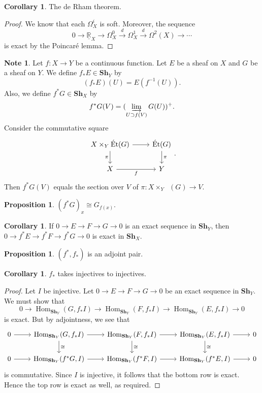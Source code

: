\documentclass[10pt,letterpaper,cm]{nupset}
\theoremstyle{definition}
\newtheorem{note}[definition]{Note}
\theoremstyle{theorem}
\newtheorem{prop}[definition]{Proposition}
\newtheorem{corollary}[definition]{Corollary}
\theoremstyle{remark}
\newcommand{\R}{\mathbb{R}}
\newcommand{\1}{\mathbb{1}}
\newcommand{\0}{\vec 0}
\DeclareMathOperator{\Hom}{Hom}
\DeclareMathOperator{\Et}{\acute{E}t}
\begin{document}
\begin{corollary}
The de Rham theorem.
\end{corollary}
\begin{proof}
We know that each $\Omega_X^i$ is soft. Moreover, the sequence $$0 \to \underline{\R}_X \to \Omega_X^0 \overset{d}{\longrightarrow} \Omega_X^1 \overset{d}{\longrightarrow} \Omega^2(X) \to \cdots$$ is exact by the Poincar\'e lemma.
\end{proof}

\begin{note}
Let $f :X \to Y$ be a continuous function. Let $E$ be a sheaf on $X$ and $G$ be a sheaf on $Y$. We define $f_{\ast}{E} \in \mathbf{Sh}_Y$ by $$(f_{\ast}{E})(U) = E(f^{-1}(U)).$$ Also, we define $f^{\ast}{G} \in \mathbf{Sh}_X$ by $$f^{\ast}{G}(V) = (\varinjlim_{U \supset f(V)} G(U))^{+}.$$ Consider the commutative square
\[\begin{tikzcd}
 X \times_Y \Et(G) \arrow[d, "\pi"'] \arrow[r] & \Et(G) \arrow[d, "\pi"] \\
X \arrow[r, "f"']                              & Y                      
\end{tikzcd}
.\] Then $f^{\ast}{G}(V)$ equals the section over $V$ of  $\pi : X \times_Y \Et(G) \to V$.
\end{note}

\begin{prop}
$(f^{\ast}{G})_x \cong G_{f(x)}$.
\end{prop}

\begin{corollary}
If $0 \to E \to F \to G \to 0$ is an exact sequence in $\mathbf{Sh}_Y$, then $0 \to f^{\ast}{E} \to f^{\ast}{F} \to f^{\ast}{G} \to 0$ is exact in $\mathbf{Sh}_X$.
\end{corollary}

\begin{prop}
$(f^{\ast}, f_{\ast})$ is an adjoint pair.
\end{prop}

\begin{corollary}
$f_{\ast}$ takes injectives to injectives.
\end{corollary}
\begin{proof}
Let $I$ be injective. Let $0 \to E \to F \to G \to 0$ be an exact sequence in $\mathbf{Sh}_Y$. We must show that $$ 0 \to \Hom_{\mathbf{Sh}_Y}(G, f_{\ast}I) \to \Hom_{\mathbf{Sh}_Y}(F, f_{\ast}I)   \to  \Hom_{\mathbf{Sh}_Y}(E, f_{\ast}I) \to 0  $$ is exact. But by adjointness, we see that
\[
\begin{tikzcd}
0 \arrow[r] & { \Hom_{\mathbf{Sh}_Y}(G, f_{\ast}I)} \arrow[r] \arrow[d, "\cong"] & { \Hom_{\mathbf{Sh}_Y}(F, f_{\ast}I)} \arrow[r] \arrow[d, "\cong"]         & { \Hom_{\mathbf{Sh}_Y}(E, f_{\ast}I)} \arrow[r] \arrow[d, "\cong"] & 0 \\
0 \arrow[r] & { \Hom_{\mathbf{Sh}_Y}(f^{\ast}G, I)} \arrow[r]                    &  {\Hom_{\mathbf{Sh}_Y}(f^{\ast}F, I)} \arrow[r] & { \Hom_{\mathbf{Sh}_Y}(f^{\ast}E, I)} \arrow[r]                    & 0
\end{tikzcd}
\] is commutative. Since $I$ is injective, it follows that the bottom row is exact. Hence the top row is exact as well, as required. 
\end{proof}
\end{document}
